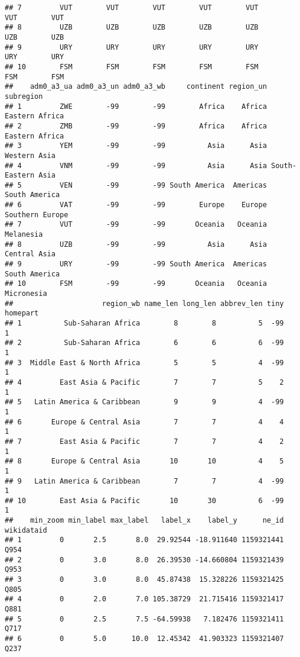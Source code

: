 \documentclass[
]{article}
\begin{document}
\begin{verbatim}
## 7         VUT        VUT        VUT        VUT        VUT        VUT        VUT
## 8         UZB        UZB        UZB        UZB        UZB        UZB        UZB
## 9         URY        URY        URY        URY        URY        URY        URY
## 10        FSM        FSM        FSM        FSM        FSM        FSM        FSM
##    adm0_a3_ua adm0_a3_un adm0_a3_wb     continent region_un          subregion
## 1         ZWE        -99        -99        Africa    Africa     Eastern Africa
## 2         ZMB        -99        -99        Africa    Africa     Eastern Africa
## 3         YEM        -99        -99          Asia      Asia       Western Asia
## 4         VNM        -99        -99          Asia      Asia South-Eastern Asia
## 5         VEN        -99        -99 South America  Americas      South America
## 6         VAT        -99        -99        Europe    Europe    Southern Europe
## 7         VUT        -99        -99       Oceania   Oceania          Melanesia
## 8         UZB        -99        -99          Asia      Asia       Central Asia
## 9         URY        -99        -99 South America  Americas      South America
## 10        FSM        -99        -99       Oceania   Oceania         Micronesia
##                     region_wb name_len long_len abbrev_len tiny homepart
## 1          Sub-Saharan Africa        8        8          5  -99        1
## 2          Sub-Saharan Africa        6        6          6  -99        1
## 3  Middle East & North Africa        5        5          4  -99        1
## 4         East Asia & Pacific        7        7          5    2        1
## 5   Latin America & Caribbean        9        9          4  -99        1
## 6       Europe & Central Asia        7        7          4    4        1
## 7         East Asia & Pacific        7        7          4    2        1
## 8       Europe & Central Asia       10       10          4    5        1
## 9   Latin America & Caribbean        7        7          4  -99        1
## 10        East Asia & Pacific       10       30          6  -99        1
##    min_zoom min_label max_label   label_x    label_y      ne_id wikidataid
## 1         0       2.5       8.0  29.92544 -18.911640 1159321441       Q954
## 2         0       3.0       8.0  26.39530 -14.660804 1159321439       Q953
## 3         0       3.0       8.0  45.87438  15.328226 1159321425       Q805
## 4         0       2.0       7.0 105.38729  21.715416 1159321417       Q881
## 5         0       2.5       7.5 -64.59938   7.182476 1159321411       Q717
## 6         0       5.0      10.0  12.45342  41.903323 1159321407       Q237

\end{verbatim}
\end{document}
